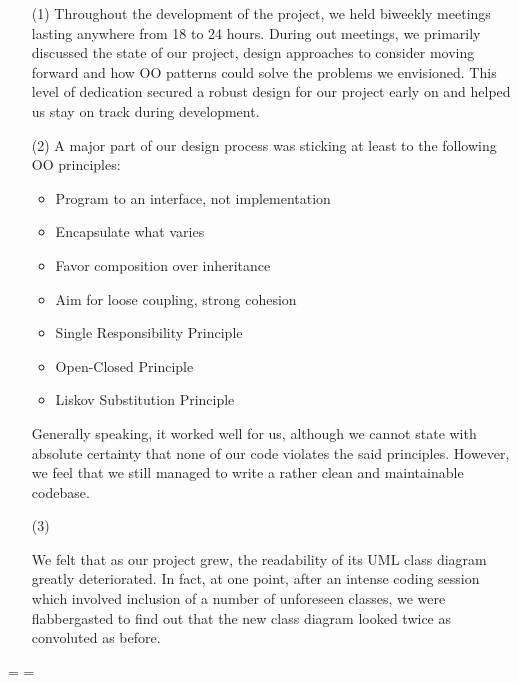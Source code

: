 \documentclass[11pt]{amsart}
\begin{document}
\begin{enumerate}
    \item[(1)] Throughout the development of the project, we held biweekly meetings lasting anywhere from 18 to 24 hours. During out meetings, we primarily discussed the state of our project, design approaches to consider moving forward and how OO patterns could solve the problems we envisioned. This level of dedication secured a robust design for our project early on and helped us stay on track during development. 
    \item[(2)] A major part of our design process was sticking at least to the following OO principles:
    \begin{itemize}
        \item Program to an interface, not implementation
        \item Encapsulate what varies
        \item Favor composition over inheritance
        \item Aim for loose coupling, strong cohesion
        \item Single Responsibility Principle
        \item Open-Closed Principle
        \item Liskov Substitution Principle
    \end{itemize}

    Generally speaking, it worked well for us, although we cannot state with absolute certainty that none of our code violates the said principles. However, we feel that we still managed to write a rather clean and maintainable codebase. 
    
    \item[(3)]
    
    We felt that as our project grew, the readability of its UML class diagram greatly deteriorated. In fact, at one point, after an intense coding session which involved inclusion of a number of unforeseen classes, we were flabbergasted to find out that the new class diagram looked twice as convoluted as before.


\end{enumerate}

\newpage
\paperwidth=30in
\paperheight=20in
\pdfpagewidth=\paperwidth
\pdfpageheight=\paperheight


\end{document}
